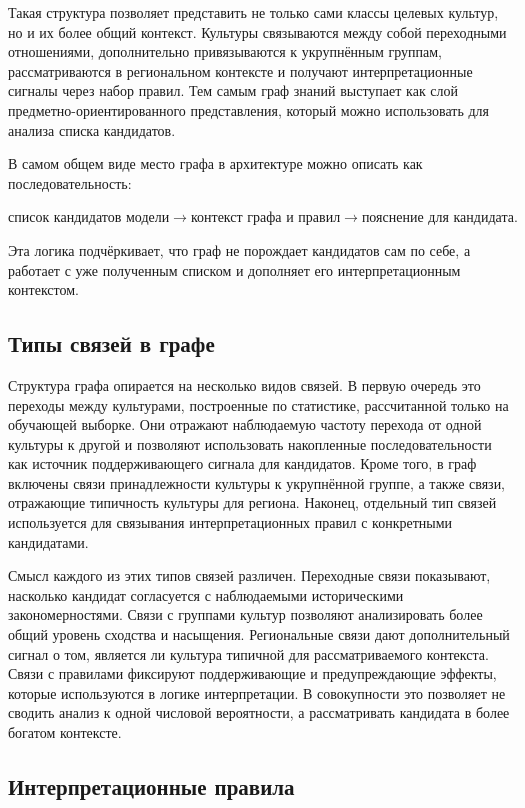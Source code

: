Такая структура позволяет представить не только сами классы целевых культур, но и их
более общий контекст. Культуры связываются между собой переходными отношениями,
дополнительно привязываются к укрупнённым группам, рассматриваются в региональном
контексте и получают интерпретационные сигналы через набор правил. Тем самым граф
знаний выступает как слой предметно-ориентированного представления, который можно
использовать для анализа списка кандидатов.

В самом общем виде место графа в архитектуре можно описать как последовательность:
\begin{center}\(
\text{список кандидатов модели}
\rightarrow
\text{контекст графа и правил}
\rightarrow
\text{пояснение для кандидата}.
\)\end{center}

Эта логика подчёркивает, что граф не порождает кандидатов сам по себе, а работает
с уже полученным списком и дополняет его интерпретационным контекстом.

\subsection{Типы связей в графе}

Структура графа опирается на несколько видов связей. В первую очередь это переходы
между культурами, построенные по статистике, рассчитанной только на обучающей выборке.
Они отражают наблюдаемую частоту перехода от одной культуры к другой и позволяют
использовать накопленные последовательности как источник поддерживающего сигнала для
кандидатов. Кроме того, в граф включены связи принадлежности культуры к укрупнённой
группе, а также связи, отражающие типичность культуры для региона. Наконец, отдельный
тип связей используется для связывания интерпретационных правил с конкретными
кандидатами.

Смысл каждого из этих типов связей различен. Переходные связи показывают, насколько
кандидат согласуется с наблюдаемыми историческими закономерностями. Связи с группами
культур позволяют анализировать более общий уровень сходства и насыщения. Региональные
связи дают дополнительный сигнал о том, является ли культура типичной для
рассматриваемого контекста. Связи с правилами фиксируют поддерживающие и
предупреждающие эффекты, которые используются в логике интерпретации. В совокупности
это позволяет не сводить анализ к одной числовой вероятности, а рассматривать
кандидата в более богатом контексте.

\subsection{Интерпретационные правила}


